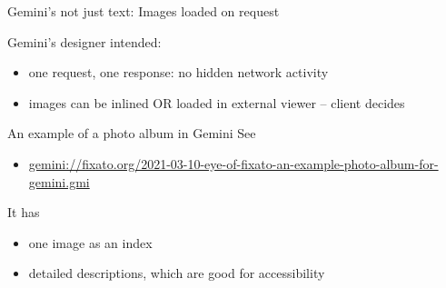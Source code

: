 \documentclass[presentation, 11pt,  aspectratio=169]{beamer}
\begin{document}
\begin{frame}[label={sec:orga2d2346}]{Gemini's not just text:  Images loaded on request}
\begin{block}{Gemini's designer intended:}
\begin{itemize}
\item one request, one response: no hidden network activity\\
\item images can be inlined OR loaded in external viewer -- \alert{client decides}\\
\end{itemize}

\pause
\end{block}
\begin{block}{An example of a photo album in Gemini}
See\\
\begin{small}
\begin{itemize}
\item \href{gemini://fixato.org/2021-03-10-eye-of-fixato-an-example-photo-album-for-gemini.gmi}{gemini://fixato.org/2021-03-10-eye-of-fixato-an-example-photo-album-for-gemini.gmi}\\
\end{itemize}
\end{small}
It has\\
\begin{itemize}
\item one image as an index\\
\item detailed descriptions, which are good for accessibility\\
\end{itemize}
\end{block}
\end{frame}
\end{document}
